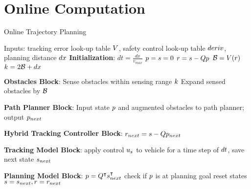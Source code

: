 \section{Online Computation \label{sec:online}}
\begin{algorithm}[bp]
	
	\caption{Online Trajectory Planning}
	\label{alg:algOnline}
	\begin{algorithmic}[1]
		\STATE Inputs: tracking error look-up table $V$, safety control look-up table $deriv$, planning distance $dx$
		\STATE \textbf{Initialization}: \label{ln:Istart}
		\STATE $dt = \frac{dx}{v_{max}}$ \label{ln:dt}
		\STATE $p = s = 0$
		\STATE $r = s - Qp$
		\STATE $\mathcal B = V(r)$
		\STATE $k = 2\mathcal B+dx$ 	\label{ln:Iend}
		
		\STATE \textbf{Obstacles Block}: \label{ln:obsStart}
		\STATE Sense obstacles within sensing range $k$
		\STATE Expand sensed obstacles by $\mathcal B$ \label{ln:obsEnd}
		
		\STATE \textbf{Path Planner Block}:\label{ln:plannerStart}
		\STATE Input state $p$ and augmented obstacles to path planner; output $p_{next}$\label{ln:plannerEnd}
		
		\STATE \textbf{Hybrid Tracking Controller Block}:\label{ln:controllerStart}
		\STATE $r_{next} = s - Qp_{next}$
		
		\ELSE {} \ENDIF \label{ln:controllerEnd}
		
		\STATE \textbf{Tracking Model Block}: \label{ln:trackingStart}
		\STATE apply control $u_s$ to vehicle for a time step of $dt$, save next state $s_{next}$ \label{ln:trackingEnd}
		
		\STATE \textbf{Planning Model Block}:\label{ln:planningStart}
		\STATE $p = Q^\intercal s_{next}^\intercal$
		\STATE check if $p$ is at planning goal
		\STATE reset states $s = s_{next}, r = r_{next}$ \label{ln:planningEnd}
		\ENDWHILE
	\end{algorithmic}
\end{algorithm}


